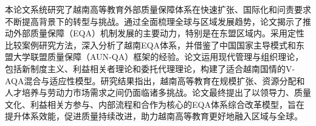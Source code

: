 


\makeatother




\begin{cabstract}
本论文系统研究了越南高等教育外部质量保障体系在快速扩张、国际化和问责要求不断提高背景下的转型与挑战。通过全面梳理全球与区域发展趋势，论文揭示了推动外部质量保障（EQA）机制发展的主要动力，特别是在东盟区域内。采用定性比较案例研究方法，深入分析了越南EQA体系，并借鉴了中国国家主导模式和东盟大学联盟质量保障（AUN-QA）框架的经验。论文运用现代管理与组织理论，包括新制度主义、利益相关者理论和委托代理理论，构建了适合越南国情的V-AQA混合与适应性模型。研究结果指出，越南高等教育在规模扩张、资源分配和人才培养与劳动力市场需求之间仍面临诸多挑战。论文最终提出了以领导力、质量文化、利益相关方参与、内部流程和合作为核心的EQA体系综合改革模型，旨在提升体系效能，促进质量持续改进，助力越南高等教育更好地融入区域与全球。
\end{cabstract}

